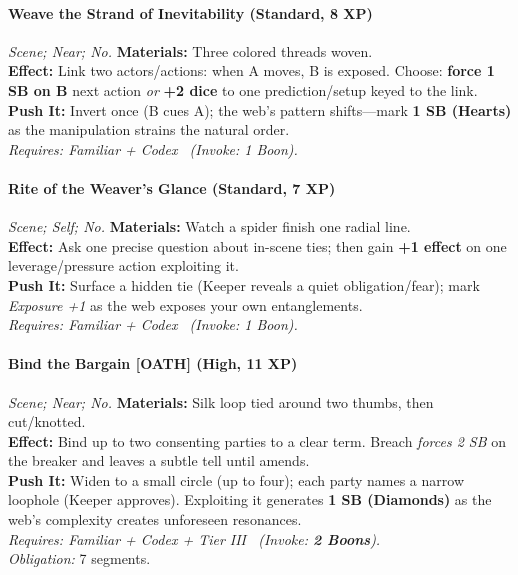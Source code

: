 \paragraph{Weave the Strand of Inevitability (Standard, 8 XP)} \emph{Scene; Near; No.}
\textbf{Materials:} Three colored threads woven.\\
\textbf{Effect:} Link two actors/actions: when A moves, B is exposed. Choose: \textbf{force 1 SB on B} next action \emph{or} \textbf{+2 dice} to one prediction/setup keyed to the link.\\
\textbf{Push It:} Invert once (B cues A); the web's pattern shifts—mark \textbf{1 SB (Hearts)} as the manipulation strains the natural order.\\
\emph{Requires: Familiar + Codex \ (\textit{Invoke:} 1 Boon).}

\paragraph{Rite of the Weaver's Glance (Standard, 7 XP)} \emph{Scene; Self; No.}
\textbf{Materials:} Watch a spider finish one radial line.\\
\textbf{Effect:} Ask one precise question about in-scene ties; then gain \textbf{+1 effect} on one leverage/pressure action exploiting it.\\
\textbf{Push It:} Surface a hidden tie (Keeper reveals a quiet obligation/fear); mark \emph{Exposure +1} as the web exposes your own entanglements.\\
\emph{Requires: Familiar + Codex \ (\textit{Invoke:} 1 Boon).}

\paragraph{Bind the Bargain \textnormal{[OATH]} (High, 11 XP)} \emph{Scene; Near; No.}
\textbf{Materials:} Silk loop tied around two thumbs, then cut/knotted.\\
\textbf{Effect:} Bind up to two consenting parties to a clear term. Breach \emph{forces 2 SB} on the breaker and leaves a subtle tell until amends.\\
\textbf{Push It:} Widen to a small circle (up to four); each party names a narrow loophole (Keeper approves). Exploiting it generates \textbf{1 SB (Diamonds)} as the web's complexity creates unforeseen resonances.\\
\emph{Requires: Familiar + Codex + Tier III \ (\textit{Invoke:} \textbf{2 Boons}).}\\
\emph{Obligation:} 7 segments.